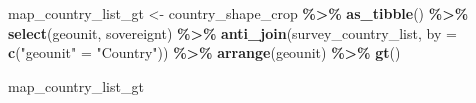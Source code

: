 \documentclass[
]{krantz}
\makeatletter
\newenvironment{Shaded}{\begin{snugshade}}{\end{snugshade}}
\newcommand{\AttributeTok}[1]{\textcolor[rgb]{0.27,0.27,0.27}{#1}}
\newcommand{\FunctionTok}[1]{\textcolor[rgb]{0.27,0.27,0.27}{\textbf{#1}}}
\newcommand{\NormalTok}[1]{#1}
\newcommand{\OtherTok}[1]{\textcolor[rgb]{0.37,0.37,0.37}{#1}}
\newcommand{\SpecialCharTok}[1]{\textcolor[rgb]{0.43,0.43,0.43}{\textbf{#1}}}
\newcommand{\StringTok}[1]{\textcolor[rgb]{0.5,0.5,0.5}{#1}}
\newenvironment{kframe}{%
\medskip{}
\setlength{\fboxsep}{.8em}
 \def\at@end@of@kframe{}%
 \ifinner\ifhmode%
  \def\at@end@of@kframe{\end{minipage}}%
  \begin{minipage}{\columnwidth}%
 \fi\fi%
 \def\FrameCommand##1{\hskip\@totalleftmargin \hskip-\fboxsep
 \colorbox{shadecolor}{##1}\hskip-\fboxsep
     \hskip-\linewidth \hskip-\@totalleftmargin \hskip\columnwidth}%
 \MakeFramed {\advance\hsize-\width
   \@totalleftmargin\z@ \linewidth\hsize
   \@setminipage}}%
 {\par\unskip\endMakeFramed%
 \at@end@of@kframe}
\renewenvironment{Shaded}{\begin{kframe}}{\end{kframe}}
\makeatother
\begin{document}
\begin{Shaded}
\begin{Highlighting}[]
\NormalTok{map\_country\_list\_gt }\OtherTok{\textless{}{-}}\NormalTok{ country\_shape\_crop }\SpecialCharTok{\%\textgreater{}\%}
  \FunctionTok{as\_tibble}\NormalTok{() }\SpecialCharTok{\%\textgreater{}\%}
  \FunctionTok{select}\NormalTok{(geounit, sovereignt) }\SpecialCharTok{\%\textgreater{}\%}
  \FunctionTok{anti\_join}\NormalTok{(survey\_country\_list, }\AttributeTok{by =} \FunctionTok{c}\NormalTok{(}\StringTok{"geounit"} \OtherTok{=} \StringTok{"Country"}\NormalTok{)) }\SpecialCharTok{\%\textgreater{}\%}
  \FunctionTok{arrange}\NormalTok{(geounit) }\SpecialCharTok{\%\textgreater{}\%}
  \FunctionTok{gt}\NormalTok{()}
\end{Highlighting}
\end{Shaded}

\begin{Shaded}
\begin{Highlighting}[]
\NormalTok{map\_country\_list\_gt}
\end{Highlighting}
\end{Shaded}
\end{document}
